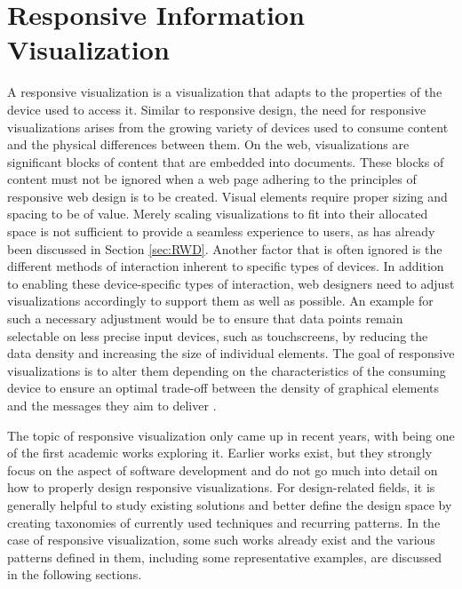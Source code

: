 \chapter{Responsive Information Visualization}

A responsive visualization is a visualization that adapts to the properties of the device used to access it. Similar to responsive design, the need for responsive visualizations arises from the growing variety of devices used to consume content and the physical differences between them. On the web, visualizations are significant blocks of content that are embedded into documents. These blocks of content must not be ignored when a web page adhering to the principles of responsive web design is to be created. Visual elements require proper sizing and spacing to be of value. Merely scaling visualizations to fit into their allocated space is not sufficient to provide a seamless experience to users, as has already been discussed in Section \ref{sec:RWD}. Another factor that is often ignored is the different methods of interaction inherent to specific types of devices. In addition to enabling these device-specific types of interaction, web designers need to adjust visualizations accordingly to support them as well as possible. An example for such a necessary adjustment would be to ensure that data points remain selectable on less precise input devices, such as touchscreens, by reducing the data density and increasing the size of individual elements. The goal of responsive visualizations is to alter them depending on the characteristics of the consuming device to ensure an optimal trade-off between the density of graphical elements and the messages they aim to deliver \parencite{DesignPatternsTradeOffsRespVis}. 

The topic of responsive visualization only came up in recent years, with \cite{RespVis} being one of the first academic works exploring it. Earlier works \parencite{BuildingRespDataVisForTheWeb,LearningRespDataVis} exist, but they strongly focus on the aspect of software development and do not go much into detail on how to properly design responsive visualizations.  For design-related fields, it is generally helpful to study existing solutions and better define the design space by creating taxonomies of currently used techniques and recurring patterns. In the case of responsive visualization, some such works already exist \parencite{TechniquesForFlexibleRespVisDesign,DesignPatternsTradeOffsRespVis,RespVisSurvey} and the various patterns defined in them, including some representative examples, are discussed in the following sections.

